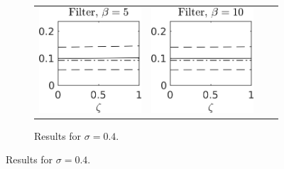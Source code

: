 \documentclass[10pt]{article}
\begin{document}
\begin{figure}[t]
\begin{subfigure}{\linewidth}
\begin{tabular}{cccc}
		\includegraphics[]{Figures/A_filt_s4_b5.png} & \includegraphics[]{Figures/A_filt_s4_b10.png}
	\end{tabular}	
	\caption{Results for $\sigma = 0.4$.}
	\end{subfigure}


\end{figure}
\end{document}
